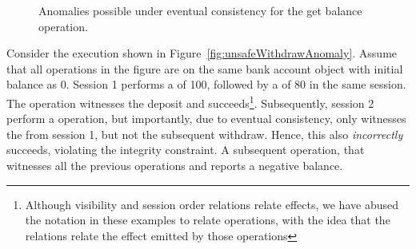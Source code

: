 \begin{figure}
\centering
{}
\hfill
{}
\hfill
{}
\caption{Anomalies possible under eventual consistency for the get balance operation.}
\label{fig:cleanliness_examples}
\end{figure}

Consider the execution shown in Figure~\ref{fig:unsafeWithdrawAnomaly}. Assume
that all operations in the figure are on the same bank account object with
initial balance as 0. Session 1 performs a  of 100, followed by a
 of 80 in the same session. The  operation witnesses
the deposit and succeeds\footnote{Although visibility and session order
relations relate effects, we have abused the notation in these examples to
relate operations, with the idea that the relations relate the effect emitted
by those operations}. Subsequently, session 2 perform a 
operation, but importantly, due to eventual consistency, only witnesses the
 from session 1, but not the subsequent withdraw. Hence, this
 also \emph{incorrectly} succeeds, violating the integrity
constraint. A subsequent  operation, that witnesses all the
previous operations and reports a negative balance.

